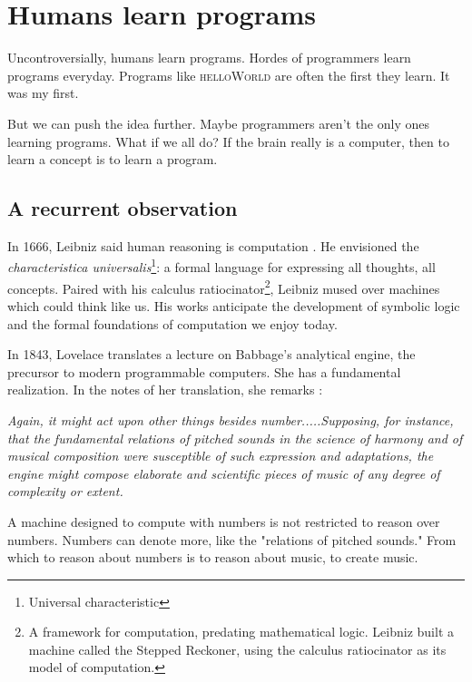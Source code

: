 \section{Humans learn programs}
Uncontroversially, humans learn programs. Hordes of programmers learn programs everyday. Programs like \textsc{helloWorld} are often the first they learn. It was my first.

But we can push the idea further. Maybe programmers aren't the only ones learning programs. What if we all do? If the brain really is a computer, then to learn a concept is to learn a program.

\subsection{A recurrent observation}

In 1666, Leibniz said human reasoning is computation \cite{leibniz1989dissertation}. He envisioned the \textit{characteristica universalis}\footnote{Universal characteristic}: a formal language for expressing all thoughts, all concepts. Paired with his calculus ratiocinator\footnote{A framework for computation, predating mathematical logic. Leibniz built a machine called the Stepped Reckoner, using the calculus ratiocinator as its model of computation.}, Leibniz mused over machines which could think like us. His works anticipate the development of symbolic logic and the formal foundations of computation we enjoy today. 

In 1843, Lovelace translates a lecture on Babbage's analytical engine, the precursor to modern programmable computers. She has a fundamental realization. In the notes of her translation, she remarks \cite{lovelacenotes}:

\begin{displayquote}
\begin{singlespace}
\textit{Again, it might act upon other things besides number.....Supposing, for instance, that the fundamental relations of pitched sounds in the science of harmony and of musical composition were susceptible of such expression and adaptations, the engine might compose elaborate and scientific pieces of music of any degree of complexity or extent.}
\end{singlespace}
\end{displayquote}

A machine designed to compute with numbers is not restricted to reason over numbers. Numbers can denote more, like the "relations of pitched sounds." From which to reason about numbers is to reason about music, to create music.

